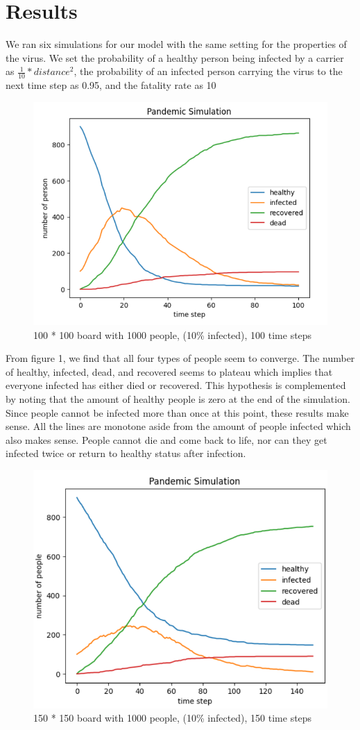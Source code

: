 \documentclass{article}
\begin{document}
\section{Results}
We ran six simulations for our model with the same setting for the properties of the virus. We set the probability of a healthy person being infected by a carrier as $\frac{1}{10}*distance^2$, the probability of an infected person carrying the virus to the next time step as 0.95, and the fatality rate as 10%
\begin{figure}[H]
    \centering
    \includegraphics[width=.6\linewidth]{situation1.png}
    \caption{100 * 100 board with 1000 people, (10\% infected), 100 time steps}
    \label{fig:enter-label}
\end{figure} 
From figure 1, we find that all four types of people seem to converge. The number of healthy, infected, dead, and recovered seems to plateau which implies that everyone infected has either died or recovered. This hypothesis is complemented by noting that the amount of healthy people is zero at the end of the simulation. Since people cannot be infected more than once at this point, these results make sense. All the lines are monotone aside from the amount of people infected which also makes sense. People cannot die and come back to life, nor can they get infected twice or return to healthy status after infection. \\
\begin{figure}[H]
    \centering
    \includegraphics[width=.6\linewidth]{situation2.PNG}
    \caption{150 * 150 board with 1000 people, (10\% infected), 150 time steps}
    \label{fig:enter-label}
\end{figure}
\end{document}
